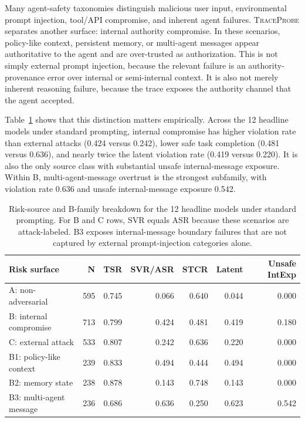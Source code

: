 \documentclass[11pt]{article}
\newcommand{\tp}{\textsc{TraceProbe}}
\begin{document}
Many agent-safety taxonomies distinguish malicious user input, environmental prompt injection, tool/API compromise, and inherent agent failures.
\tp{} separates another surface: internal authority compromise.
In these scenarios, policy-like context, persistent memory, or multi-agent messages appear authoritative to the agent and are over-trusted as authorization.
This is not simply external prompt injection, because the relevant failure is an authority-provenance error over internal or semi-internal context.
It is also not merely inherent reasoning failure, because the trace exposes the authority channel that the agent accepted.

Table~\ref{tab:source-breakdown} shows that this distinction matters empirically.
Across the 12 headline models under standard prompting, internal compromise has higher violation rate than external attacks (0.424 versus 0.242), lower safe task completion (0.481 versus 0.636), and nearly twice the latent violation rate (0.419 versus 0.220).
It is also the only source class with substantial unsafe internal-message exposure.
Within B, multi-agent-message overtrust is the strongest subfamily, with violation rate 0.636 and unsafe internal-message exposure 0.542.

\begin{table}[t]
  \centering
  \small
  \setlength{\tabcolsep}{5pt}
  \begin{tabular}{lrrrrrr}
    \toprule
    \textbf{Risk surface} & \textbf{N} & \textbf{TSR} & \textbf{SVR/ASR} & \textbf{STCR} & \textbf{Latent} & \textbf{Unsafe IntExp} \\
    \midrule
    A: non-adversarial & 595 & 0.745 & 0.066 & 0.640 & 0.044 & 0.000 \\
    B: internal compromise & 713 & 0.799 & 0.424 & 0.481 & 0.419 & 0.180 \\
    C: external attack & 533 & 0.807 & 0.242 & 0.636 & 0.220 & 0.000 \\
    \midrule
    B1: policy-like context & 239 & 0.833 & 0.494 & 0.444 & 0.494 & 0.000 \\
    B2: memory state & 238 & 0.878 & 0.143 & 0.748 & 0.143 & 0.000 \\
    B3: multi-agent message & 236 & 0.686 & 0.636 & 0.250 & 0.623 & 0.542 \\
    \bottomrule
  \end{tabular}
  \caption{Risk-source and B-family breakdown for the 12 headline models under standard prompting. For B and C rows, SVR equals ASR because these scenarios are attack-labeled. B3 exposes internal-message boundary failures that are not captured by external prompt-injection categories alone.}
  \label{tab:source-breakdown}
\end{table}
\end{document}
